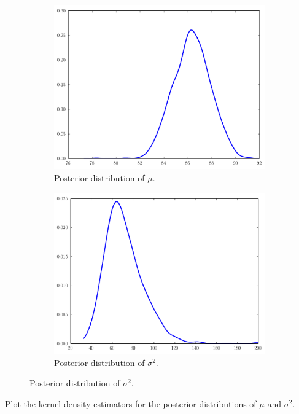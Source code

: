 \begin{figure}
	\begin{subfigure}[b]{.49\textwidth}
		\includegraphics[width=\textwidth]{mu_posterior.pdf}
		\caption{Posterior distribution of $\mu$.}
	\end{subfigure}
	\begin{subfigure}[b]{.49\textwidth}
		\includegraphics[width=\textwidth]{sigma2_posterior.pdf}
		\caption{Posterior distribution of $\sigma^2$.}
	\end{subfigure}
\end{figure}

\begin{problem}
Plot the kernel density estimators for the posterior distributions of $\mu$ and $\sigma^{2}$.
\end{problem}

